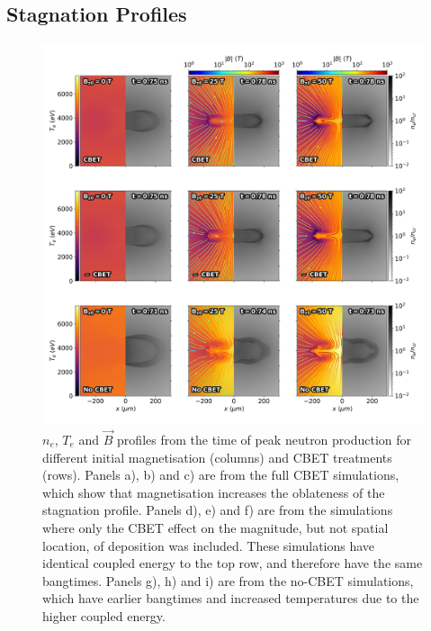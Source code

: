 \subsection{Stagnation Profiles}%
\label{sec:Res2_stgnation_profiles}

\begin{figure}[t!]
    \includegraphics[width=\linewidth]{Results2/Images/allall_stagnation.png}
    \centering
    \caption{$n_e$, $T_e$ and $\vec{B}$ profiles from the time of peak neutron production for different initial magnetisation (columns) and \ac{CBET} treatments (rows).
    Panels a), b) and c) are from the full \ac{CBET} simulations, which show that magnetisation increases the oblateness of the stagnation profile.
    Panels d), e) and f) are from the simulations where only the \ac{CBET} effect on the magnitude, but not spatial location, of deposition was included.
    These simulations have identical coupled energy to the top row, and therefore have the same bangtimes.
    Panels g), h) and i) are from the no-\ac{CBET} simulations, which have earlier bangtimes and increased temperatures due to the higher coupled energy.}%
    \label{fig:Res2_allall_stagnation}
\end{figure}

